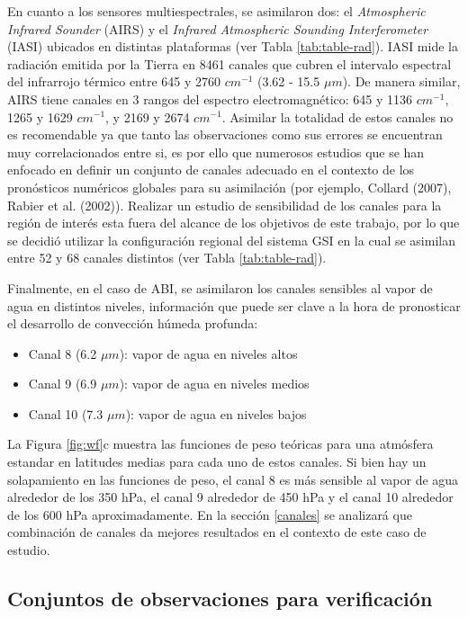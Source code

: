 \documentclass[12pt,oneside]{reedthesis}
\providecommand{\tightlist}{%
  \setlength{\itemsep}{0pt}\setlength{\parskip}{0pt}}
\begin{document}
En cuanto a los sensores multiespectrales, se asimilaron dos: el \emph{Atmospheric Infrared Sounder} (AIRS) y el \emph{Infrared Atmospheric Sounding Interferometer} (IASI) ubicados en distintas plataformas (ver Tabla \ref{tab:table-rad}). IASI mide la radiación emitida por la Tierra en 8461 canales que cubren el intervalo espectral del infrarrojo térmico entre 645 y 2760 \(cm^{-1}\) (3.62 - 15.5 \(\mu m\)). De manera similar, AIRS tiene canales en 3 rangos del espectro electromagnético: 645 y 1136 \(cm^{-1}\), 1265 y 1629 \(cm^{-1}\), y 2169 y 2674 \(cm^{-1}\). Asimilar la totalidad de estos canales no es recomendable ya que tanto las observaciones como sus errores se encuentran muy correlacionados entre si, es por ello que numerosos estudios que se han enfocado en definir un conjunto de canales adecuado en el contexto de los pronósticos numéricos globales para su asimilación (por ejemplo, Collard (2007), Rabier et al. (2002)). Realizar un estudio de sensibilidad de los canales para la región de interés esta fuera del alcance de los objetivos de este trabajo, por lo que se decidió utilizar la configuración regional del sistema GSI en la cual se asimilan entre 52 y 68 canales distintos (ver Tabla \ref{tab:table-rad}).

Finalmente, en el caso de ABI, se asimilaron los canales sensibles al vapor de agua en distintos niveles, información que puede ser clave a la hora de pronosticar el desarrollo de convección húmeda profunda:
\begin{itemize}
\tightlist
\item
  Canal 8 (6.2 \(\mu m\)): vapor de agua en niveles altos
\item
  Canal 9 (6.9 \(\mu m\)): vapor de agua en niveles medios
\item
  Canal 10 (7.3 \(\mu m\)): vapor de agua en niveles bajos
\end{itemize}
La Figura \ref{fig:wf}c muestra las funciones de peso teóricas para una atmósfera estandar en latitudes medias para cada uno de estos canales. Si bien hay un solapamiento en las funciones de peso, el canal 8 es más sensible al vapor de agua alrededor de los 350 hPa, el canal 9 alrededor de 450 hPa y el canal 10 alrededor de los 600 hPa aproximadamente. En la sección \ref{canales} se analizará que combinación de canales da mejores resultados en el contexto de este caso de estudio.

\hypertarget{conjuntos-de-observaciones-para-verificaciuxf3n}{%
\subsection{Conjuntos de observaciones para verificación}\label{conjuntos-de-observaciones-para-verificaciuxf3n}}
\end{document}
